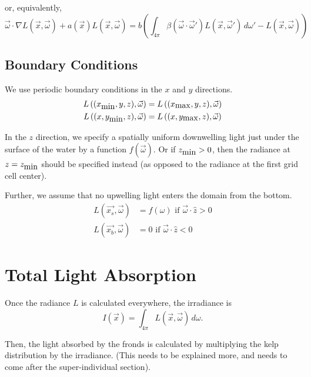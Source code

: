 or, equivalently,
\begin{equation}
  \vec{\omega} \cdot \nabla L(\vec{x}, \vec{\omega})
  + a(\vec{x})L(\vec{x}, \vec{\omega})
  = b \left(
    \int_{4\pi} \beta(\vec{\omega}\cdot\vec{\omega}') L(\vec{x}, \vec{\omega}')\, d\omega'
    - L(\vec{x}, \vec{\omega})
  \right)
\end{equation}

\subsection{Boundary Conditions}

We use periodic boundary conditions in the $x$ and $y$ directions.
\begin{align}
  L\left((x_{\mbox{min}}, y, z), \vec{\omega}\right) &= L\left((x_{\mbox{max}}, y, z), \vec{\omega}\right) \\
  L\left((x, y_{\mbox{min}}, z), \vec{\omega}\right) &= L\left((x, y_{\mbox{max}}, z), \vec{\omega}\right)
\end{align}

In the $z$ direction, we specify a spatially uniform downwelling light just
under the surface of the water by a function $f(\vec{\omega})$.
Or if $z_{\mbox{min}}>0$, then the radiance at $z=z_{\mbox{min}}$ should be specified instead (as opposed to the radiance at the first grid cell center).

Further, we assume that no upwelling light enters the domain from the bottom.
\begin{align}
  L(\vec{x_s}, \vec{\omega}) &= f(\omega) \mbox{ if } \vec{\omega} \cdot \hat{z} > 0\\ 
  L(\vec{x_b}, \vec{\omega}) &= 0 \mbox { if } \vec{\omega} \cdot \hat{z} < 0
\end{align}
 
\section{Total Light Absorption}
Once the radiance $L$ is calculated everywhere, the irradiance is
\begin{equation}
  I(\vec{x}) = \int_{4\pi}L(\vec{x},\vec{\omega})\, d\omega.
\end{equation}

Then, the light absorbed by the fronds is calculated by multiplying the kelp distribution by the irradiance.
(This needs to be explained more, and needs to come after the super-individual section).
